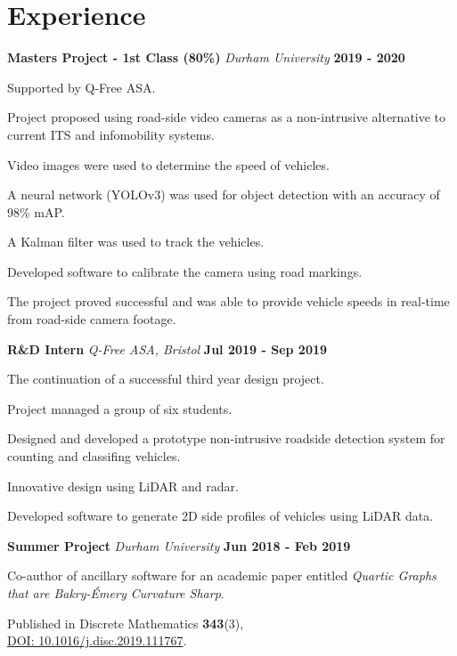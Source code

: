 \documentclass[a4paper, 12pt, hidelinks]{article}
\newcommand{\xp}[3]{
	\vspace{0.25em}
	\textbf{#1} \quad \emph{#2} \hfill \textbf{#3}
}
\begin{document}
	\begin{minipage}{0.587\textwidth}
		\vspace{-0.5em}
		
		\section{Experience}
		\xp{Masters Project - 1st Class (80\%)}{Durham University}{2019 - 2020}
		\begin{itemise}
			\item Supported by Q-Free ASA.
			\item Project proposed using road-side video cameras as a non-intrusive alternative to current ITS and infomobility systems.
			\item Video images were used to determine the speed of vehicles.
			\item A neural network (YOLOv3) was used for object detection with an accuracy of 98\% mAP.
			\item A Kalman filter was used to track the vehicles.
			\item Developed software to calibrate the camera using road markings.
			\item The project proved successful and was able to provide vehicle speeds in real-time from road-side camera footage.
			\hfill
			\href{http://www.francisgurr.com/pages/masters_project/masters_project.html}{\faExternalLink}
		\end{itemise}
		\xp{R\&D Intern}{Q-Free ASA, Bristol}{Jul 2019 - Sep 2019}
		\begin{itemise}
			\item The continuation of a successful third year design project.
			\item Project managed a group of six students.
			\item Designed and developed a prototype non-intrusive roadside detection system for counting and classifing vehicles.
			\item Innovative design using LiDAR and radar.
			\item Developed software to generate 2D side profiles of vehicles using LiDAR data.
			\hfill
			\href{http://www.francisgurr.com/pages/qfree_internship/qfree_internship.html}{\faExternalLink}
		\end{itemise}
		\xp{Summer Project}{Durham University}{Jun 2018 - Feb 2019}
		\begin{itemise}
			\item Co-author of ancillary software for an academic paper entitled \emph{Quartic Graphs that are Bakry-Émery Curvature Sharp}.
			\item Published in Discrete Mathematics \textbf{343}(3),\\ \href{https://doi.org/10.1016/j.disc.2019.111767}{DOI: 10.1016/j.disc.2019.111767}.
			\hfill
			\href{http://www.francisgurr.com/math-project}{\faExternalLink}
		\end{itemise}
		

\end{minipage}
\end{document}
